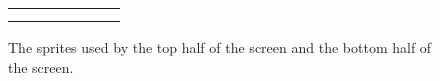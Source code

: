 \begin{figure}[H]
{\begin{adjustbox}{width=14cm,center}
\begin{tabular}{ccccccc}
{} & 
\makecell[l]{
	\begin{subfigure}{0.3\textwidth}
    \def\MULTICOLORONE{gray}
    \def\MULTICOLORTWO{white}
    \def\SPRITECOLOR{red}
		
	\end{subfigure}
} & 
\makecell[l]{
	\begin{subfigure}{0.3\textwidth}
    \def\MULTICOLORONE{gray}
    \def\MULTICOLORTWO{white}
    \def\SPRITECOLOR{orange}
		
	\end{subfigure}
} & 
\makecell[l]{
	\begin{subfigure}{0.3\textwidth}
    \def\MULTICOLORONE{gray}
    \def\MULTICOLORTWO{white}
    \def\SPRITECOLOR{yellow}
		
	\end{subfigure}
} & 
\makecell[l]{
	\begin{subfigure}{0.3\textwidth}
    \def\MULTICOLORONE{gray}
    \def\MULTICOLORTWO{white}
    \def\SPRITECOLOR{green}
		
	\end{subfigure}
} & 
\makecell[l]{
	\begin{subfigure}{0.3\textwidth}
    \def\MULTICOLORONE{gray}
    \def\MULTICOLORTWO{white}
    \def\SPRITECOLOR{lightblue}
		
	\end{subfigure}
} & 
\makecell[l]{
	\begin{subfigure}{0.3\textwidth}
    \def\MULTICOLORONE{gray}
    \def\MULTICOLORTWO{white}
    \def\SPRITECOLOR{purple}
		
	\end{subfigure}
} \\ 
        \addlinespace
        \bottomrule
      \end{tabular}
    \end{adjustbox}
  }\caption{The sprites used by the top half of the screen and the bottom half of the screen.}
\end{figure}
